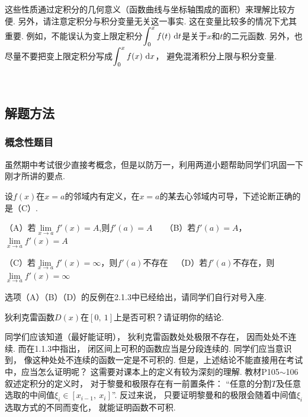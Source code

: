 这些性质通过定积分的几何意义（函数曲线与坐标轴围成的面积）来理解比较方便. 另外，请注意定积分与积分变量无关这一事实. 这在变量比较多的情况下尤其重要.
例如，不能误认为变上限定积分$\displaystyle\int_{0}^{x}f(t)~\mathrm{d} t$是关于$x$和$t$的二元函数. 另外，也尽量不要把变上限定积分写成$\displaystyle\int_{0}^{x}f(x)~\mathrm{d} x$，
避免混淆积分上限与积分变量.\par
~\par

\subsection{解题方法}

\subsubsection{概念性题目}

虽然期中考试很少直接考概念，但是以防万一，利用两道小题帮助同学们巩固一下刚才所讲的要点.

\begin{example}
\label{ex:ch02-01}
设$f(x)$在$x=a$的邻域内有定义，在$x=a$的某去心邻域内可导，下述论断正确的是（C）.\par
（A）若$\lim\limits_{x \to a}f'(x)=A$,则$f'(a)=A$~~~（B）若$f'(a)=A$，$\lim\limits_{x \to a}f'(x)=A$\par
（C）若$\lim\limits_{x \to a}f'(x)=\infty$，则$f'(a)$不存在~~（D）若$f'(a)$不存在，则$\lim\limits_{x \to a}f'(x)=\infty$
\end{example}

\begin{solution}
选项（A）（B）（D）的反例在2.1.3中已经给出，请同学们自行对号入座.
\end{solution}

\begin{example}
\label{ex:ch02-02}
狄利克雷函数$D(x)$在$[0,~1]$上是否可积？请证明你的结论.
\end{example}

\begin{analysis}
同学们应该知道（最好能证明），
狄利克雷函数处处极限不存在，
因而处处不连续.
而在1.1.3中指出，
闭区间上可积的函数应当是分段连续的.
同学们应当意识到，
像这种处处不连续的函数一定是不可积的.
但是，上述结论不能直接用在考试中，应当怎么证明呢？
这需要对课本上的定义有较为深刻的理解.
教材P105$\sim$106叙述定积分的定义时，
对于黎曼和极限存在有一前置条件：
“任意的分割$T$及任意选取的中间值$\xi_{i} \in [x_{i-1},~x_{i}]$”.
反过来说，
只要证明黎曼和的极限会随着中间值$\xi_{i}$选取方式的不同而变化，
就能证明函数不可积.
\end{analysis}

